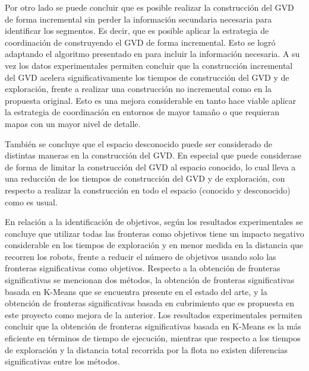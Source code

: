 Por otro lado se puede concluir que es posible realizar la construcción del GVD
de forma incremental sin perder la información secundaria necesaria para
identificar los segmentos. Es decir, que es posible aplicar la estrategia de
coordinación de \cite{wurm2008coordinated} construyendo el GVD de forma
incremental. Esto se logró adaptando el algoritmo presentado en \cite{Lau2013}
para incluir la información necesaria. A su vez los datos experimentales permiten
concluir que la construcción incremental del GVD acelera significativamente los
tiempos de construcción del GVD y de exploración, frente a realizar una
construcción no incremental como en la propuesta original. Esto es una mejora
considerable en tanto hace viable aplicar la estrategia de coordinación en
entornos de mayor tamaño o que requieran mapas con un mayor nivel de detalle.


También se concluye que el espacio desconocido puede ser considerado de
distintas maneras en la construcción del GVD. En especial que puede considerase
de forma de limitar la construcción del GVD al espacio conocido, lo cual lleva
a una reducción de los tiempos de construcción del GVD y de exploración, con
respecto a realizar la construcción en todo el espacio (conocido y desconocido)
como es usual.




En relación a la identificación de objetivos, según los resultados
experimentales se concluye que utilizar todas las fronteras como objetivos
tiene un impacto negativo considerable en los tiempos de exploración y en menor
medida en la distancia que recorren los robots, frente a reducir el número de
objetivos usando solo las fronteras significativas como objetivos.
Respecto a la obtención de fronteras significativas se mencionan dos métodos, la
obtención de fronteras significativas basada en K-Means que se encuentra presente en el estado del
arte, y la obtención de fronteras significativas basada en cubrimiento que es propuesta en este proyecto como
mejora de la anterior. Los resultados experimentales permiten concluir que la
obtención de fronteras significativas basada en K-Means es la más eficiente en términos de tiempo de
ejecución, mientras que respecto a los tiempos de exploración y la distancia total
recorrida por la flota no existen diferencias significativas entre los métodos.

